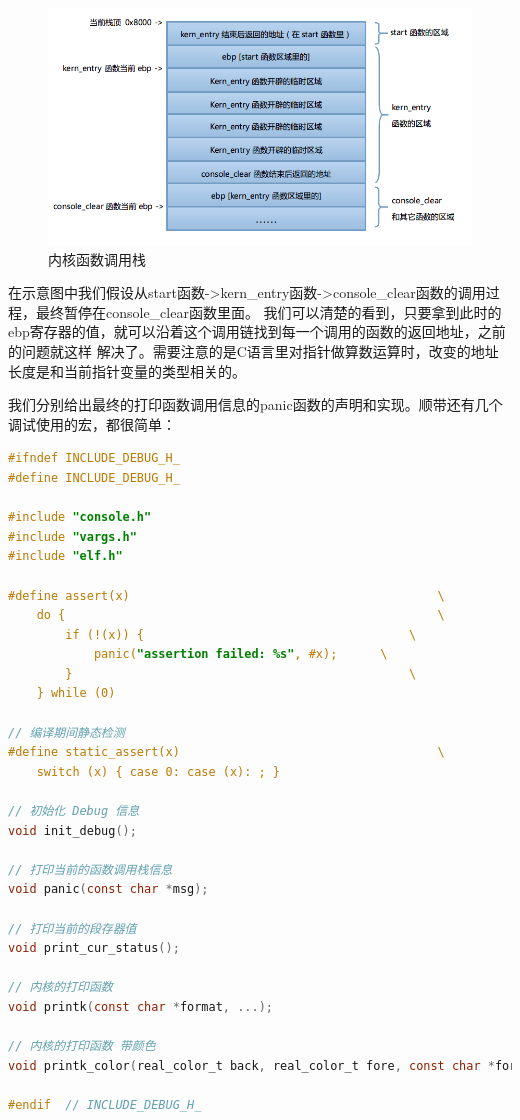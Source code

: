 \begin{figure}[H]
      \centering
      \includegraphics[scale=0.5]{picture/chapt5/os_function_stack.png}
      \caption{内核函数调用栈}
\end{figure}

\par 在示意图中我们假设从start函数->kern\_entry函数->console\_clear函数的调用过程，最终暂停在console\_clear函数里面。\allowbreak
我们可以清楚的看到，只要拿到此时的ebp寄存器的值，就可以沿着这个调用链找到每一个调用的函数的返回地址，之前的问题就这样\allowbreak
解决了。需要注意的是C语言里对指针做算数运算时，改变的地址长度是和当前指针变量的类型相关的。

\par 我们分别给出最终的打印函数调用信息的panic函数的声明和实现。顺带还有几个调试使用的宏，都很简单：

\begin{lstlisting}[language = C, caption = debug/debug.h]
#ifndef INCLUDE_DEBUG_H_
#define INCLUDE_DEBUG_H_

#include "console.h"
#include "vargs.h"
#include "elf.h"

#define assert(x)                                       	\
	do {                                                	\
		if (!(x)) {                                     \
			panic("assertion failed: %s", #x);      \
		}                                               \
	} while (0)

// 编译期间静态检测
#define static_assert(x)                                	\
	switch (x) { case 0: case (x): ; }

// 初始化 Debug 信息
void init_debug();

// 打印当前的函数调用栈信息
void panic(const char *msg);

// 打印当前的段存器值
void print_cur_status();

// 内核的打印函数
void printk(const char *format, ...);

// 内核的打印函数 带颜色
void printk_color(real_color_t back, real_color_t fore, const char *format, ...);

#endif 	// INCLUDE_DEBUG_H_
\end{lstlisting}

